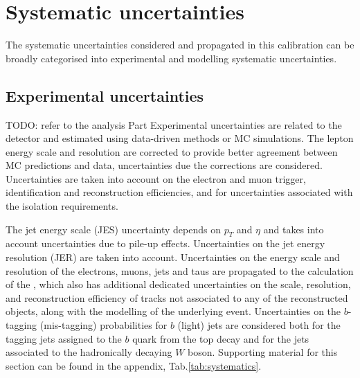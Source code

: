 \section{Systematic uncertainties}
\label{sec:FTAG_systematics}
The systematic uncertainties considered and propagated in this calibration 
can be broadly categorised into experimental and modelling systematic uncertainties. 
\subsection{Experimental uncertainties}
TODO: refer to the analysis Part
Experimental uncertainties are related to the detector and estimated using 
data-driven methods or MC simulations. 
The lepton energy scale and resolution are corrected to 
provide better agreement between MC predictions and data, uncertainties 
due the corrections are considered. Uncertainties are taken into account on the 
electron and muon trigger, identification and reconstruction efficiencies, and for 
uncertainties associated with the isolation requirements. 

The jet energy scale (JES) uncertainty depends on $p_T$ and $\eta$ and 
takes into account uncertainties due to pile-up effects. Uncertainties on the jet energy resolution (JER) 
are taken into account. Uncertainties on the energy scale and resolution of 
the electrons, muons, jets and taus are propagated to the calculation of the \MET, 
which also has additional dedicated uncertainties on the scale, resolution, and 
reconstruction efficiency of tracks not associated to any of the reconstructed objects,
 along with the modelling of the underlying event. Uncertainties on the $b$-tagging (mis-tagging) 
 probabilities for $b$ (light) jets are considered both for the tagging jets assigned to the $b$ quark 
 from the top decay and for the jets associated to the hadronically decaying $W$ boson.
Supporting material for this section can be found in the appendix, Tab.\ref{tab:systematics}.

